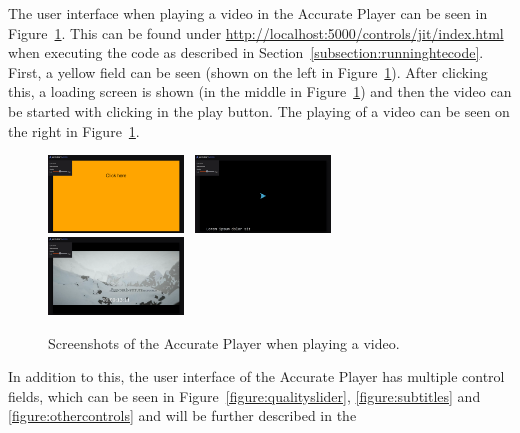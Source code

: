 \documentclass[../MasterThesis.tex]{subfiles}
\begin{document}
\hypersetup{urlcolor=black}
The user interface when playing a video in the Accurate Player can be seen in Figure~\ref{figure:AV_before}. This can be found under \url{http://localhost:5000/controls/jit/index.html} when executing the code as described in Section~\ref{subsection:runninghtecode}.
First, a yellow field can be seen (shown on the left in Figure~\ref{figure:AV_before}). After clicking this, a loading screen is shown (in the middle in Figure~\ref{figure:AV_before}) and then the video can be started with clicking in the play button. The playing of a video can be seen on the right in Figure~\ref{figure:AV_before}.


\begin{figure}[H]
	\begin{center}
		\includegraphics[width=0.32\textwidth]{AV1_before.png} \ 
		\includegraphics[width=0.32\textwidth]{AV2_before.png} \ 
		\includegraphics[width=0.32\textwidth]{AV3_before.png}
		\caption[Screenshots of the frontend.]{Screenshots of the Accurate Player when playing a video.}
		\label{figure:AV_before}
	\end{center}
\end{figure}
%
%
%
%
%
%
%
%
%
\sodef{}
%
In addition to this, the user interface of the Accurate Player has multiple control fields, which can be seen in Figure~\ref{figure:qualityslider}, \ref{figure:subtitles} and \ref{figure:othercontrols} and will be further described in the 
%
\end{document}

